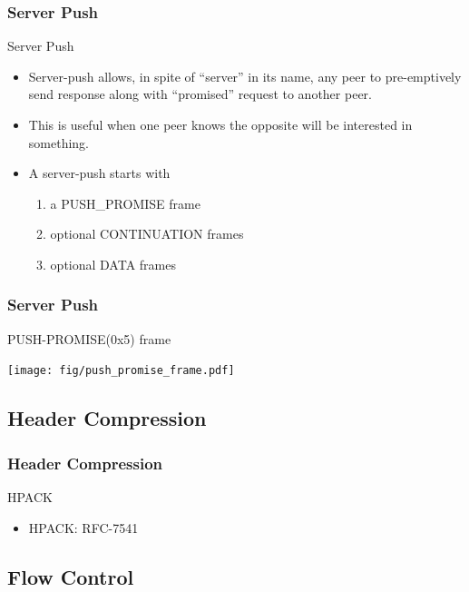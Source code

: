 \documentclass[lualatex]{beamer}
\begin{document}
\begin{frame}
  \frametitle{Server Push}

  \begin{block}{Server Push}
    \begin{itemize}
    \item Server-push allows, in spite of ``server'' in its name, any peer to pre-emptively send response along with ``promised'' request to another peer.
    \item This is useful when one peer knows the opposite will be interested in something.
    \item A server-push starts with
      \begin{enumerate}
      \item a PUSH\_PROMISE frame
      \item optional CONTINUATION frames
      \item optional DATA frames
      \end{enumerate}
    \end{itemize}
  \end{block}
\end{frame}

\begin{frame}
  \frametitle{Server Push}

  \begin{block}{PUSH-PROMISE(0x5) frame}
    \begin{center}
      \texttt{[image: fig/push\_promise\_frame.pdf]}
    \end{center}
  \end{block}
\end{frame}

\subsection{Header Compression}

\begin{frame}
  \frametitle{Header Compression}
  \begin{block}{HPACK}
    \begin{itemize}
    \item HPACK: RFC-7541
    \end{itemize}
  \end{block}
\end{frame}

\subsection{Flow Control}
\end{document}
